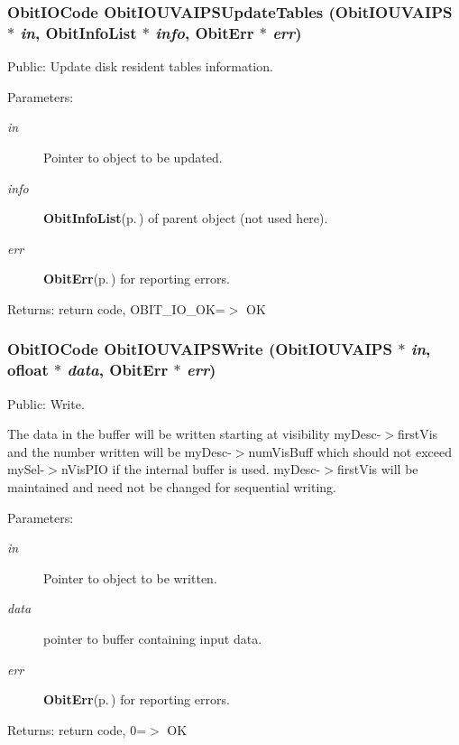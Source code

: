 \subsubsection{\setlength{\rightskip}{0pt plus 5cm}Obit\-IOCode Obit\-IOUVAIPSUpdate\-Tables ({\bf Obit\-IOUVAIPS} $\ast$ {\em in}, {\bf Obit\-Info\-List} $\ast$ {\em info}, {\bf Obit\-Err} $\ast$ {\em err})}\label{ObitIOUVAIPS_8h_a25}


Public: Update disk resident tables information. 

\begin{Desc}
\item[Parameters:]
\begin{description}
\item[{\em in}]Pointer to object to be updated. \item[{\em info}]{\bf Obit\-Info\-List}{\rm (p.\,\pageref{structObitInfoList})} of parent object (not used here). \item[{\em err}]{\bf Obit\-Err}{\rm (p.\,\pageref{structObitErr})} for reporting errors. \end{description}
\end{Desc}
\begin{Desc}
\item[Returns:]return code, OBIT\_\-IO\_\-OK=$>$ OK \end{Desc}
\subsubsection{\setlength{\rightskip}{0pt plus 5cm}Obit\-IOCode Obit\-IOUVAIPSWrite ({\bf Obit\-IOUVAIPS} $\ast$ {\em in}, {\bf ofloat} $\ast$ {\em data}, {\bf Obit\-Err} $\ast$ {\em err})}\label{ObitIOUVAIPS_8h_a19}


Public: Write. 

The data in the buffer will be written starting at visibility my\-Desc-$>$first\-Vis and the number written will be my\-Desc-$>$num\-Vis\-Buff which should not exceed my\-Sel-$>$n\-Vis\-PIO if the internal buffer is used. my\-Desc-$>$first\-Vis will be maintained and need not be changed for sequential writing. \begin{Desc}
\item[Parameters:]
\begin{description}
\item[{\em in}]Pointer to object to be written. \item[{\em data}]pointer to buffer containing input data. \item[{\em err}]{\bf Obit\-Err}{\rm (p.\,\pageref{structObitErr})} for reporting errors. \end{description}
\end{Desc}
\begin{Desc}
\item[Returns:]return code, 0=$>$ OK \end{Desc}
